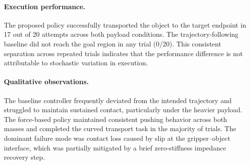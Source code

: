 \paragraph{Execution performance.} The proposed policy successfully transported the object to the target endpoint in 17 out of 20 attempts across both payload conditions. The trajectory-following baseline did not reach the goal region in any trial (0/20). This consistent separation across repeated trials indicates that the performance difference is not attributable to stochastic variation in execution.

\paragraph{Qualitative observations.} The baseline controller frequently deviated from the intended trajectory and struggled to maintain sustained contact, particularly under the heavier payload. The force-based policy maintained consistent pushing behavior across both masses and completed the curved transport task in the majority of trials. The dominant failure mode was contact loss caused by slip at the gripper--object interface, which was partially mitigated by a brief zero-stiffness impedance recovery step.